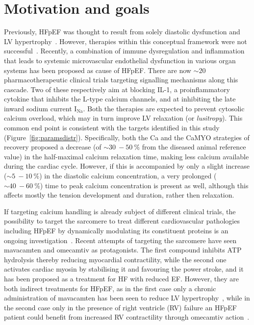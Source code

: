 \section{Motivation and goals}\label{sec:ch1motivation_and_goals}
Previously, HFpEF was thought to result from solely diastolic dysfunction and LV hypertrophy~\cite{Patel:2019}. However, therapies within this conceptual framework were not successful~\cite{Cleland:2014}. Recently, a combination of immune dysregulation and inflammation that leads to systemic microvascular endothelial dysfunction in various organ systems has been proposed as cause of HFpEF. There are now $\sim 20$ pharmacotherapeutic clinical trials targeting signalling mechanisms along this cascade. Two of these respectively aim at blocking IL-1, a proinflammatory cytokine that inhibits the L-type calcium channels, and at inhibiting the late inward sodium current $\text{I}_{\text{Na}}$. Both the therapies are expected to prevent cytosolic calcium overload, which may in turn improve LV relaxation (or \textit{lusitropy}). This common end point is consistent with the targets identified in this study (Figure~\ref{fig:paramsdistr}). Specifically, both the Ca and the CaMYO strategies of recovery proposed a decrease (of $\sim\SI{30}{}-\SI{50}{\percent}$ from the diseased animal reference value) in the half-maximal calcium relaxation time, making less calcium available during the cardiac cycle. However, if this is accompanied by only a slight increase ($\sim\SI{5}{}-\SI{10}{\percent}$) in the diastolic calcium concentration, a very prolonged ($\sim\SI{40}{}-\SI{60}{\percent}$) time to peak calcium concentration is present as well, although this affects mostly the tension development and duration, rather then relaxation.

\vspace{0.2cm}
If targeting calcium handling is already subject of different clinical trials, the possibility to target the sarcomere to treat different cardiovascular pathologies including HFpEF by dynamically modulating its constituent proteins is an ongoing investigation~\cite{Patel:2019}. Recent attempts of targeting the sarcomere have seen mavacamten and omecamtiv as protagonists. The first compound inhibits ATP hydrolysis thereby reducing myocardial contractility, while the second one activates cardiac myosin by stabilising it and favouring the power stroke, and it has been proposed as a treatment for HF with reduced EF. However, they are both indirect treatments for HFpEF, as in the first case only a chronic administration of mavacamten has been seen to reduce LV hypertrophy~\cite{Green:2016}, while in the second case only in the presence of right ventricle (RV) failure an HFpEF patient could benefit from increased RV contractility through omecamtiv action~\cite{Planelles-Herrero:2017}.

